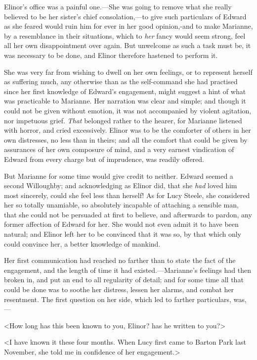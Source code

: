 Elinor's office was a painful one.—She was going to remove what she really believed to be her sister's chief consolation,—to give such particulars of Edward as she feared would ruin him for ever in her good opinion,-and to make Marianne, by a resemblance in their situations, which to \textit{her} fancy would seem strong, feel all her own disappointment over again. But unwelcome as such a task must be, it was necessary to be done, and Elinor therefore hastened to perform it.

She was very far from wishing to dwell on her own feelings, or to represent herself as suffering much, any otherwise than as the self-command she had practised since her first knowledge of Edward's engagement, might suggest a hint of what was practicable to Marianne. Her narration was clear and simple; and though it could not be given without emotion, it was not accompanied by violent agitation, nor impetuous grief. \textit{That} belonged rather to the hearer, for Marianne listened with horror, and cried excessively. Elinor was to be the comforter of others in her own distresses, no less than in theirs; and all the comfort that could be given by assurances of her own composure of mind, and a very earnest vindication of Edward from every charge but of imprudence, was readily offered.

But Marianne for some time would give credit to neither. Edward seemed a second Willoughby; and acknowledging as Elinor did, that she \textit{had} loved him most sincerely, could she feel less than herself! As for Lucy Steele, she considered her so totally unamiable, so absolutely incapable of attaching a sensible man, that she could not be persuaded at first to believe, and afterwards to pardon, any former affection of Edward for her. She would not even admit it to have been natural; and Elinor left her to be convinced that it was so, by that which only could convince her, a better knowledge of mankind.

Her first communication had reached no farther than to state the fact of the engagement, and the length of time it had existed.—Marianne's feelings had then broken in, and put an end to all regularity of detail; and for some time all that could be done was to soothe her distress, lessen her alarms, and combat her resentment. The first question on her side, which led to farther particulars, was,—

<How long has this been known to you, Elinor? has he written to you?>

<I have known it these four months. When Lucy first came to Barton Park last November, she told me in confidence of her engagement.>

